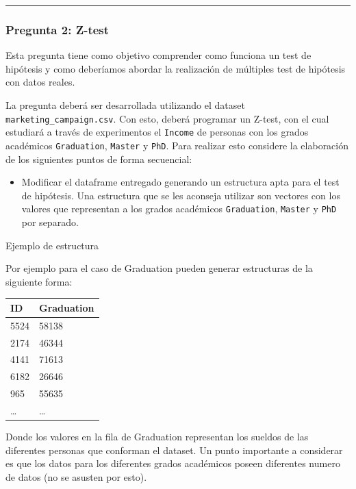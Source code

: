 \documentclass[]{article}
\providecommand{\tightlist}{%
  \setlength{\itemsep}{0pt}\setlength{\parskip}{0pt}}
\begin{document}
\begin{center}\rule{0.5\linewidth}{0.5pt}\end{center}

\hypertarget{pregunta-2-z-test}{%
\subsubsection{Pregunta 2: Z-test}\label{pregunta-2-z-test}}

Esta pregunta tiene como objetivo comprender como funciona un test de
hipótesis y como deberíamos abordar la realización de múltiples test de
hipótesis con datos reales.

La pregunta deberá ser desarrollada utilizando el dataset
\texttt{marketing\_campaign.csv}. Con esto, deberá programar un Z-test,
con el cual estudiará a través de experimentos el \texttt{Income} de
personas con los grados académicos \texttt{Graduation}, \texttt{Master}
y \texttt{PhD}. Para realizar esto considere la elaboración de los
siguientes puntos de forma secuencial:

\begin{itemize}
\tightlist
\item
  Modificar el dataframe entregado generando un estructura apta para el
  test de hipótesis. Una estructura que se les aconseja utilizar son
  vectores con los valores que representan a los grados académicos
  \texttt{Graduation}, \texttt{Master} y \texttt{PhD} por separado.
\end{itemize}

Ejemplo de estructura

Por ejemplo para el caso de Graduation pueden generar estructuras de la
siguiente forma:

\begin{longtable}[]{@{}ll@{}}
\toprule
ID & Graduation \\
\midrule
\endhead
5524 & 58138 \\
2174 & 46344 \\
4141 & 71613 \\
6182 & 26646 \\
965 & 55635 \\
\ldots{} & \ldots{} \\
\bottomrule
\end{longtable}

Donde los valores en la fila de Graduation representan los sueldos de
las diferentes personas que conforman el dataset. Un punto importante a
considerar es que los datos para los diferentes grados académicos poseen
diferentes numero de datos (no se asusten por esto).
\end{document}
